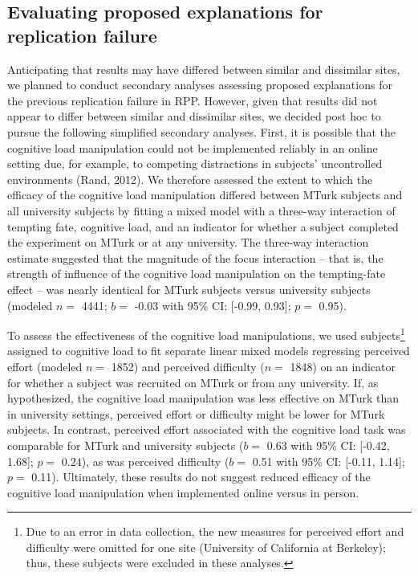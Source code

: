 \documentclass[english,floatsintext,man]{apa6}
\theoremstyle{definition}
\theoremstyle{definition}
\theoremstyle{definition}
\theoremstyle{remark}
\begin{document}
\subsection{Evaluating proposed explanations for replication
failure}\label{evaluating-proposed-explanations-for-replication-failure}

Anticipating that results may have differed between similar and
dissimilar sites, we planned to conduct secondary analyses assessing
proposed explanations for the previous replication failure in RPP.
However, given that results did not appear to differ between similar and
dissimilar sites, we decided post hoc to pursue the following simplified
secondary analyses. First, it is possible that the cognitive load
manipulation could not be implemented reliably in an online setting due,
for example, to competing distractions in subjects' uncontrolled
environments (Rand, 2012). We therefore assessed the extent to which the
efficacy of the cognitive load manipulation differed between MTurk
subjects and all university subjects by fitting a mixed model with a
three-way interaction of tempting fate, cognitive load, and an indicator
for whether a subject completed the experiment on MTurk or at any
university. The three-way interaction estimate suggested that the
magnitude of the focus interaction -- that is, the strength of influence
of the cognitive load manipulation on the tempting-fate effect -- was
nearly identical for MTurk subjects versus university subjects (modeled
\(n=\) 4441; \(b=\) -0.03 with 95\% CI: {[}-0.99, 0.93{]}; \(p=\) 0.95).

To assess the effectiveness of the cognitive load manipulations, we used
subjects\footnote{Due to an error in data collection, the new measures
  for perceived effort and difficulty were omitted for one site
  (University of California at Berkeley); thus, these subjects were
  excluded in these analyses.} assigned to cognitive load to fit
separate linear mixed models regressing perceived effort (modeled \(n=\)
1852) and perceived difficulty (\(n=\) 1848) on an indicator for whether
a subject was recruited on MTurk or from any university. If, as
hypothesized, the cognitive load manipulation was less effective on
MTurk than in university settings, perceived effort or difficulty might
be lower for MTurk subjects. In contrast, perceived effort associated
with the cognitive load task was comparable for MTurk and university
subjects (\(b=\) 0.63 with 95\% CI: {[}-0.42, 1.68{]}; \(p=\) 0.24), as
was perceived difficulty (\(b=\) 0.51 with 95\% CI: {[}-0.11, 1.14{]};
\(p=\) 0.11). Ultimately, these results do not suggest reduced efficacy
of the cognitive load manipulation when implemented online versus in
person.
\end{document}
